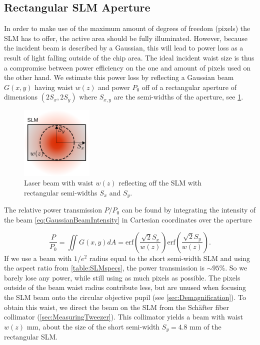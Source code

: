 \subsection{Rectangular SLM Aperture}\label{subsec:ApertureSize}

In order to make use of the maximum amount of degrees of freedom (pixels) the SLM has to offer, the active area should be fully illuminated.
However, because the incident beam is described by a Gaussian, this will lead to power loss as a result of light falling outside of the chip area.
The ideal incident waist size is thus a compromise between power efficiency on the one and amount of pixels used on the other hand.
We estimate this power loss by reflecting a Gaussian beam $G(x,y)$ having waist $w(z)$ and power $P_0$ off of a rectangular aperture of dimensions $(2S_x, 2S_y)$ where $S_{x,y}$ are the semi-widths of the aperture, see \cref{fig:Rectangular}.
\begin{figure}[h]
    \centering
    \includegraphics[width=0.31\textwidth]{figures/RectangularAperture.pdf}
    \caption{Laser beam with waist $w(z)$ reflecting off the SLM with rectangular semi-widths $S_x$ and $S_y$.}
    \label{fig:Rectangular}
\end{figure}

\noindent The relative power transmission $P/P_0$ can be found by integrating the intensity of the beam \cref{eq:GaussianBeamIntensity} in Cartesian coordinates over the aperture

\begin{equation}\label{eq:RectAperturePower}
	\frac{P}{P_0} =
	\iint G(x,y) dA=
	\text{erf}\left(\frac{\sqrt{2}S_x}{w(z)}\right) \text{erf}\left(\frac{\sqrt{2}S_y}{w(z)}\right).
\end{equation}
If we use a beam with $1/e^2$ radius equal to the short semi-width SLM and using the aspect ratio from \cref{table:SLMspecs}, the power transmission is $\sim 95$\%.
So we barely lose any power, while still using as much pixels as possible.
The pixels outside of the beam waist radius contribute less, but are unused when focusing the SLM beam onto the circular objective pupil (see \cref{sec:Demagnification}).
To obtain this waist, we direct the beam on the SLM from the Schäfter fiber collimator (\cref{sec:MeasuringTweezer}).
This collimator yields a beam with waist $w(z)$ mm, about the size of the short semi-width $S_y = 4.8$ mm of the rectangular SLM.




